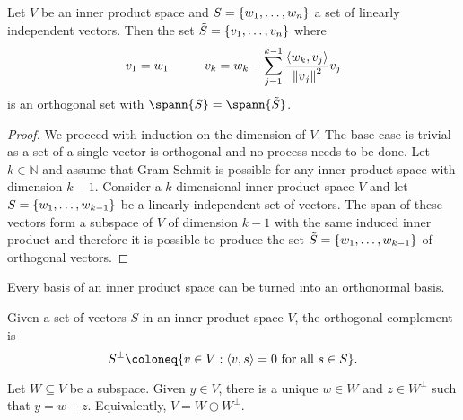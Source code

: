 \documentclass{subfiles}
\begin{document}
\begin{theorem}
    Let $V$ be an inner product space and $S = \qty{w_1, \ldots, w_n}$ a set of linearly independent vectors. Then the set $\tilde{S} = \qty{v_1, \ldots, v_n}$ where
    \begin{align*}
        v_1 = w_1 \hspace{1cm} v_k = w_k - \sum_{j=1}^{k-1} \frac{\langle w_k, v_j \rangle}{\norm{v_j}^2} v_j
    \end{align*}
    is an orthogonal set with $\spann{S} = \spann{\tilde{S}}$.
\end{theorem}

\begin{proof}
    We proceed with induction on the dimension of $V$. The base case is trivial as a set of a single vector is orthogonal and no process needs to be done. Let $k \in \mathbb{N}$ and assume that Gram-Schmit is possible for any inner product space with dimension $k-1$. Consider a $k$ dimensional inner product space $V$ and let $S = \qty{w_1, \ldots, w_{k-1}}$ be a linearly independent set of vectors. The span of these vectors form a subspace of $V$ of dimension $k-1$ with the same induced inner product and therefore it is possible to produce the set $\tilde{S} = \qty{w_1, \ldots, w_{k-1}}$ of orthogonal vectors.
\end{proof}

\begin{corollary}
    Every basis of an inner product space can be turned into an orthonormal basis.
\end{corollary}

\begin{definition}
    Given a set of vectors $S$ in an inner product space $V$, the orthogonal complement is
    \[
        S^\perp \coloneq \qty{v \in V : \langle v, s \rangle = 0 \text{ for all $s \in S$}}
    .\]
\end{definition}

\begin{theorem}
    Let $W \subseteq V$ be a subspace. Given $y \in V$, there is a unique $w \in W$ and $z \in W^\perp$ such that $y = w + z$. Equivalently, $V = W \oplus W^\perp$.
\end{theorem}
\end{document}

